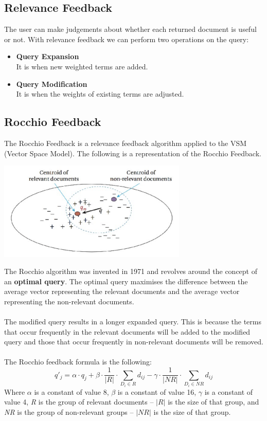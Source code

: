 \documentclass{article}
\begin{document}
\subsection{Relevance Feedback}
The user can make judgements about whether each returned document is useful or not. With relevance feedback we can perform two operations on the query:

\begin{itemize}
	\item \textbf{Query Expansion}
	\vspace{.2cm} \\
	It is when new weighted terms are added.
	
	\item \textbf{Query Modification}
	\vspace{.2cm} \\
	It is when the weights of existing terms are adjusted.
\end{itemize}

\subsection{Rocchio Feedback}
The Rocchio Feedback is a relevance feedback algorithm applied to the VSM (Vector Space Model). The following is a representation of the Rocchio Feedback.

\begin{center}
	\includegraphics[width=9cm]{rocchio.png}
\end{center}
The Rocchio algorithm was invented in 1971 and revolves around the concept of an \textbf{optimal query}. The optimal query maximises the difference between the average vector representing the relevant documents and the average vector representing the non-relevant documents. \\ \\
The modified query results in a longer expanded query. This is because the terms that occur frequently in the relevant documents will be added to the modified query and those that occur frequently in non-relevant documents will be removed. \\ \\
The Rocchio feedback formula is the following:
\[ q'_j = \alpha \cdot q_j + \beta \cdot \frac{1}{|R|} \cdot \sum_{D_i \in R} d_{ij} - \gamma \cdot \frac{1}{|NR|} \cdot \sum_{D_i \in NR} d_{ij} \]
Where $\alpha$ is a constant of value 8, $\beta$ is a constant of value 16, $\gamma$ is a constant of value 4, \textit{R} is the group of relevant documents -- $|R|$ is the size of that group, and \textit{NR} is the group of non-relevant groups -- $|NR|$ is the size of that group.
\end{document}
